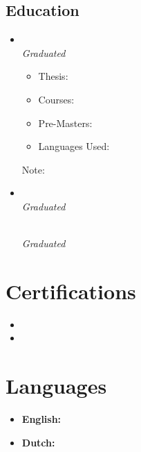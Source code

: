 \documentclass[11pt,a4paper]{article}
\begin{document}
\begin{itemize}[leftmargin=0pt,label={},itemsep=2em,topsep=0pt]
\begin{samepage}
\section{Education}
\begin{itemize}[leftmargin=0pt,label={},itemsep=2em]
\item \parbox{\textwidth}{\textbf{\MasterUniversity} \hfill \textit{\MasterLocation}}\\
\textit{\MasterCourse} \hfill \textit{Graduated \MasterGraduation}\\[4pt]
\begin{itemize}[label={--},leftmargin=*,topsep=0pt,parsep=0pt,partopsep=0pt]
    \item {\color{secondary}Thesis:} \textit{\MastersThesisTitle}\\
    \MastersThesisDescription
    \item {\color{secondary}Courses:} \MastersCourseList
    \item {\color{secondary}Pre-Masters:} \PreMastersCourseList
    \item {\color{secondary}Languages Used:} \MastersLanguages
\end{itemize}
{Note: \textit{\MastersNotableAchievement}}

\item \parbox{\textwidth}{\textbf{\BatchelorsUniversity} \hfill \textit{\BatchelorsLocation}}\\
\textit{\BatchelorsCourse} \hfill \textit{Graduated \BatchelorsGraduation}
\parbox{\textwidth}{\textbf{\HEAOHogeschool} \hfill \textit{\HEAOsLocation}}\\
\textit{\HEAOCourse} \hfill \textit{Graduated \BatchelorsGraduation}
\end{itemize}
\end{samepage}


\section{Certifications}
\begin{itemize}[leftmargin=*]
\item \CertMicrosoft
\item \CertDutch
\end{itemize}

\section{Languages}
\begin{itemize}[leftmargin=*]
\item \textbf{English:} \LangEnglish
\item \textbf{Dutch:} \LangDutch
\end{itemize} 


\end{itemize}
\end{document}
